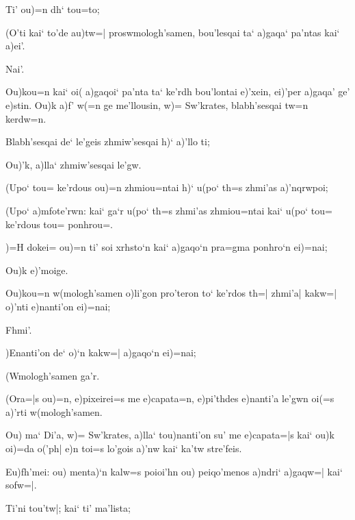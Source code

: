 \documentclass[11pt]{book}
\newcommand {\Spag} {\Npag*{=+1}\Npar{1}\numerus{1}}
\newcommand {\Spar} {\Npar*{=+1}\numerus{1}}
\begin{document}
\2 Ti' ou)=n dh` tou=to;

\1 (O'ti kai` to'de au)tw=| proswmologh'samen, bou'lesqai ta` a)gaqa` pa'ntas
kai` a)ei'.

\2 Nai'.

\1 Ou)kou=n kai` oi( a)gaqoi` pa'nta ta` ke'rdh bou'lontai e)'xein, ei)'per
a)gaqa' ge' e)stin.
\2 \Spar Ou)k a)f' w(=n ge me'llousin, w)= Sw'krates, blabh'sesqai tw=n kerdw=n.

\1 Blabh'sesqai de` le'geis zhmiw'sesqai h)` a)'llo ti;

\2 Ou)'k, a)lla` zhmiw'sesqai le'gw.

\1 (Upo` tou= ke'rdous ou)=n zhmiou=ntai h)` u(po` th=s zhmi'as a)'nqrwpoi;

\2 (Upo` a)mfote'rwn: kai` ga`r u(po` th=s zhmi'as zhmiou=ntai kai` u(po` tou=
ke'rdous tou= ponhrou=.

\1 )=H dokei= ou)=n ti' soi xrhsto`n kai` a)gaqo`n pra=gma ponhro`n ei)=nai;

\2 Ou)k e)'moige.


\1 \Spag Ou)kou=n w(mologh'samen o)li'gon pro'teron to` ke'rdos th=| zhmi'a| kakw=|
o)'nti e)nanti'on ei)=nai;


\2 Fhmi'.


\1 )Enanti'on de` o)`n kakw=| a)gaqo`n ei)=nai;


\2 (Wmologh'samen ga'r.


\1 (Ora=|s ou)=n, e)pixeirei=s me e)capata=n, e)pi'thdes e)nanti'a le'gwn oi(=s
a)'rti w(mologh'samen.


\2 Ou) ma` Di'a, w)= Sw'krates, a)lla` tou)nanti'on su' me e)capata=|s kai`
ou)k oi)=da o('ph| e)n toi=s lo'gois a)'nw kai` ka'tw stre'feis.


\1 \Spar Eu)fh'mei: ou) menta)`n kalw=s poioi'hn ou) peiqo'menos a)ndri` a)gaqw=| kai`
sofw=|.

\2 Ti'ni tou'tw|; kai` ti' ma'lista;
\end{document}

